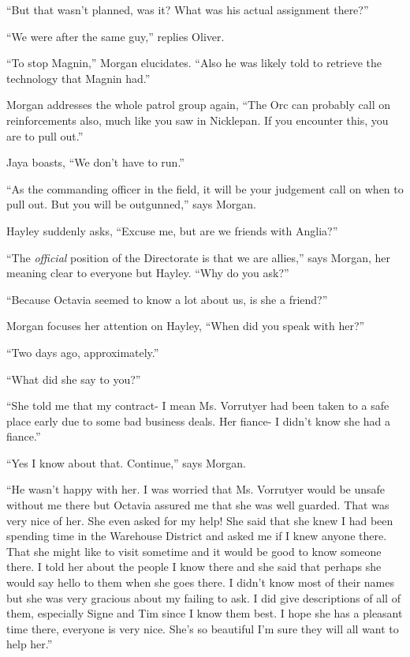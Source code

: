 ``But that wasn't planned, was it?  What was his actual assignment there?''

``We were after the same guy,'' replies Oliver.

``To stop Magnin,'' Morgan elucidates.  ``Also he was likely told to retrieve the technology that Magnin had.''



Morgan addresses the whole patrol group again, ``The Orc can probably call on reinforcements also, much like you saw in Nicklepan.  If you encounter this, you are to pull out.''

Jaya boasts, ``We don't have to run.''

``As the commanding officer in the field, it will be your judgement call on when to pull out.  But you will be outgunned,'' says Morgan.

Hayley suddenly asks, ``Excuse me, but are we friends with Anglia?''

``The \textit{official} position of the Directorate is that we are allies,'' says Morgan, her meaning clear to everyone but Hayley.  ``Why do you ask?''

``Because Octavia seemed to know a lot about us, is she a friend?''

Morgan focuses her attention on Hayley, ``When did you speak with her?''

``Two days ago, approximately.''

``What did she say to you?''

``She told me that my contract- I mean Ms. Vorrutyer had been taken to a safe place early due to some bad business deals.  Her fiance- I didn't know she had a fiance.''

``Yes I know about that. Continue,'' says Morgan.

``He wasn't happy with her.  I was worried that Ms. Vorrutyer would be unsafe without me there but Octavia assured me that she was well guarded.  That was very nice of her.  She even asked for my help!  She said that she knew I had been spending time in the Warehouse District and asked me if I knew anyone there.  That she might like to visit sometime and it would be good to know someone there.  I told her about the people I know there and she said that perhaps she would say hello to them when she goes there.  I didn't know most of their names but she was very gracious about my failing to ask.  I did give descriptions of all of them, especially Signe and Tim since I know them best.  I hope she has a pleasant time there, everyone is very nice.  She's so beautiful I'm sure they will all want to help her.''



